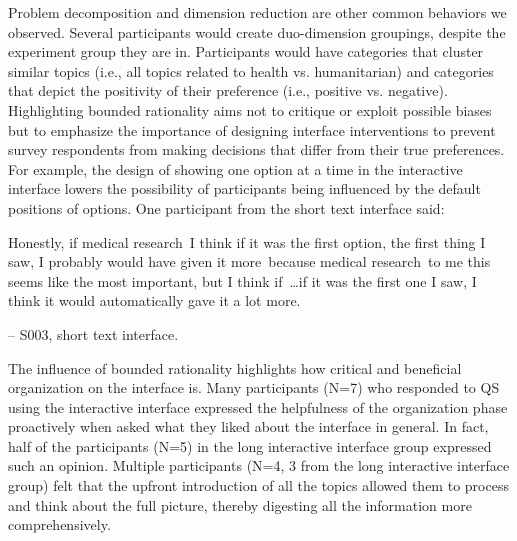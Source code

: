 Problem decomposition and dimension reduction are other common behaviors we observed. Several participants would create duo-dimension groupings, despite the experiment group they are in. Participants would have categories that cluster similar topics (i.e., all topics related to health vs. humanitarian) and categories that depict the positivity of their preference (i.e., positive vs. negative). Highlighting bounded rationality aims not to critique or exploit possible biases but to emphasize the importance of designing interface interventions to prevent survey respondents from making decisions that differ from their true preferences. For example, the design of showing one option at a time in the interactive interface lowers the possibility of participants being influenced by the default positions of options. One participant from the short text interface said:
\begin{displayquote}
Honestly, if medical research~\bracketellipsis I think if it was the first option, the first thing I saw, I probably would have given it more~\bracketellipsis because medical research~\bracketellipsis to me this seems like the most important, but I think if~\ldots if it was the first one I saw, I think it would automatically gave it a lot more.
    
\noindent \hfill -- S003, short text interface.
\end{displayquote}

    

The influence of bounded rationality highlights how critical and beneficial organization on the interface is. Many participants (N=7) who responded to QS using the interactive interface expressed the helpfulness of the organization phase proactively when asked what they liked about the interface in general. In fact, half of the participants (N=5) in the long interactive interface group expressed such an opinion. Multiple participants (N=4, 3 from the long interactive interface group) felt that the upfront introduction of all the topics allowed them to process and think about the full picture, thereby digesting all the information more comprehensively. 

